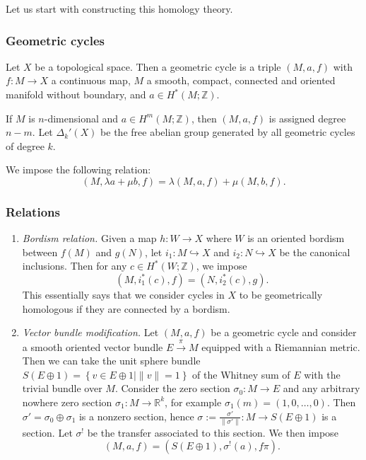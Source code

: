 \documentclass[reqno]{amsart}
\theoremstyle{definition}
\theoremstyle{remark}
\begin{document}
Let us start with constructing this homology theory.

\subsubsection{Geometric cycles}
Let $X$ be a topological space. Then a geometric cycle is
a triple $\left( M,a,f \right)$ with
$f \colon M \to X$ a continuous map,
$M$ a smooth, compact, connected and oriented manifold without
boundary, and
$a \in H^{*}(M;\mathbb{Z})$.

If $M$ is $n$-dimensional and $a \in H^{m}(M;\mathbb{Z})$, then
$\left( M,a,f \right) $ is assigned degree $n-m$.
Let $\Delta_{k}'(X)$ be the free abelian group generated
by all geometric cycles of degree $k$.

We impose the following relation:
\[
    \left( M, \lambda a + \mu b , f \right) = 
    \lambda \left( M,a,f \right) + \mu \left( M,b,f \right) .
\] 

\subsubsection{Relations}

\begin{enumerate}
    \item \textit{Bordism relation.} Given a map 
        $h \colon W \to X$ where $W$ is an oriented bordism between
        $f(M)$ and $g(N)$, let $i_1 \colon M \hookrightarrow X$ and
        $i_2 \colon N \hookrightarrow X$ be the canonical inclusions.
        Then for any $c \in H^{*}(W;\mathbb{Z})$, we impose
        \[
            \left( M, i_1^{*}(c),f \right) = 
            \left( N, i_2^{*}(c),g \right) .
        \] 
        This essentially says that we consider 
        cycles in $X$ to be geometrically homologous if they
        are connected by a bordism.
    \item \textit{Vector bundle modification.} 
        Let $\left( M,a,f \right) $ be a geometric cycle and
        consider a smooth oriented vector bundle
        $E \stackrel{\pi}{\to} M$ equipped with a Riemannian metric.
        Then we can take the unit sphere bundle
        $S\left( E \oplus 1 \right) = 
        \left\{ v \in E \oplus 1  \mid \|v\| = 1 \right\} $ of
        the Whitney sum of $E$ with the trivial bundle over $M$.
        Consider the zero section $\sigma_0 \colon M \to E$ and
        any arbitrary nowhere zero section
        $\sigma_1 \colon M \to \mathbb{R}^{k}$, for example
         $\sigma_1 (m) = (1,0, \ldots, 0)$.
         Then $\sigma' = \sigma_0 \oplus \sigma_1 $ is
         a nonzero section, hence
         $\sigma := \frac{\sigma'}{\|\sigma'\|} \colon M \to 
         S \left( E \oplus 1 \right) $ is a section.
         Let $\sigma^{!}$ be the transfer associated to this
         section. We then impose
         \[
             \left( M, a ,f \right) = 
             \left( S\left( E \oplus 1 \right) , \sigma^{!}(a), f \pi \right) .
         \] 
\end{enumerate}
\end{document}
